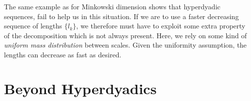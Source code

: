 The same example as for Minkowski dimension shows that hyperdyadic sequences, fail to help us in this situation. If we are to use a faster decreasing sequence of lengths $\{ l_k \}$, we therefore must have to exploit some extra property of the decomposition which is not always present. Here, we rely on some kind of \emph{uniform mass distribution} between scales. Given the uniformity assumption, the lengths can decrease as fast as desired.


\section{Beyond Hyperdyadics}

